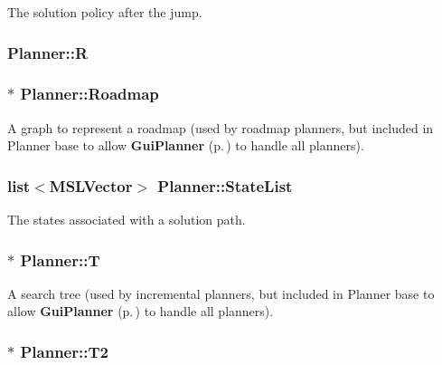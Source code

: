 The solution policy after the jump.

\subsubsection{ Planner::R\hspace{0.3cm}{\tt  [protected]}}\label{classPlanner_n0}


\subsubsection{$\ast$ Planner::Roadmap}\label{classPlanner_m14}


A graph to represent a roadmap (used by roadmap planners, but included in Planner base to allow {\bf Gui\-Planner} {\rm (p.\,\pageref{classGuiPlanner})} to handle all planners).

\subsubsection{\setlength{\rightskip}{0pt plus 5cm}list$<${\bf MSLVector}$>$ Planner::State\-List}\label{classPlanner_m15}


The states associated with a solution path.

\subsubsection{$\ast$ Planner::T}\label{classPlanner_m12}


A search tree (used by incremental planners, but included in Planner base to allow {\bf Gui\-Planner} {\rm (p.\,\pageref{classGuiPlanner})} to handle all planners).

\subsubsection{$\ast$ Planner::T2}\label{classPlanner_m13}


